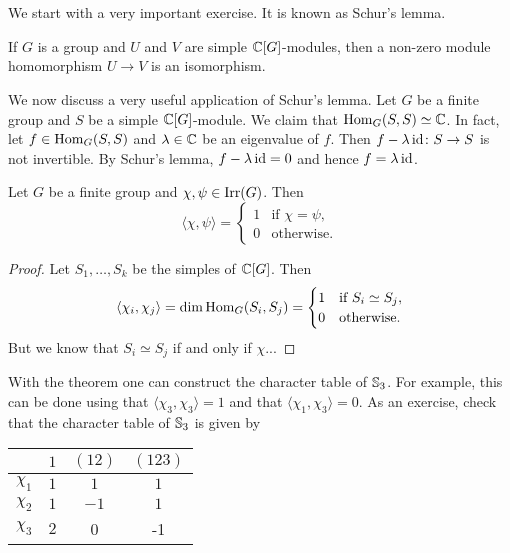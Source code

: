 \chapter{}


We start with a very important exercise. It is known as Schur's lemma. 

\begin{exercise}
\label{xca:Schur}
    If $G$ is a group and  
    $U$ and $V$ are simple $\mathbb{C}[G]$-modules, then 
    a non-zero module homomorphism $U\to V$ is an isomorphism. 
\end{exercise}

We now discuss a very useful application of Schur's lemma. 
Let $G$ be a finite group and $S$ be a simple $\mathbb{C}[G]$-module.
We claim that $\operatorname{Hom}_G(S,S)\simeq\mathbb{C}$. In fact, let 
$f\in\operatorname{Hom}_G(S,S)$ and $\lambda\in\mathbb{C}$ be an eigenvalue of $f$. Then 
$f-\lambda\operatorname{id}\colon S\to S$ is not invertible. By Schur's lemma, 
$f-\lambda\operatorname{id}=0$ and hence $f=\lambda\operatorname{id}$. 

\begin{theorem}[Schur]
    Let $G$ be a finite group and $\chi,\psi\in\operatorname{Irr}(G)$. Then
    \[
    \langle\chi,\psi\rangle=\begin{cases}
    1 & \text{if $\chi=\psi$,}\\
    0 & \text{otherwise.}
    \end{cases}
    \]
\end{theorem}

\begin{proof}
    Let $S_1,\dots,S_k$ be the simples of $\mathbb{C}[G]$. Then 
    \[
    \langle\chi_i,\chi_j\rangle=\dim\operatorname{Hom}_G(S_i,S_j)
    =\begin{cases}
    1 & \text{if $S_i\simeq S_j$},\\
    0 & \text{otherwise.}
    \end{cases}
    \]
    But we know that $S_i\simeq S_j$ if and only if 
    $\chi$...
\end{proof}

With the theorem one can construct the character table of $\mathbb{S}_3$.
For example, this can be done using that $\langle\chi_3,\chi_3\rangle=1$ 
and that $\langle\chi_1,\chi_3\rangle=0$. 
As an exercise, check that the character table of $\mathbb{S}_3$ 
is given by
    \begin{center}
		\begin{tabular}{|c|ccc|}
			\hline
			& $1$ & $(12)$ & $(123)$ \tabularnewline
			\hline 
			$\chi_{1}$ & $1$ & $1$ & $1$\tabularnewline
			$\chi_{2}$ & $1$ & $-1$ & $1$ \tabularnewline
			$\chi_{3}$ & $2$ & 0 & -1 \tabularnewline
			\hline
		\end{tabular}
	\end{center}
	
